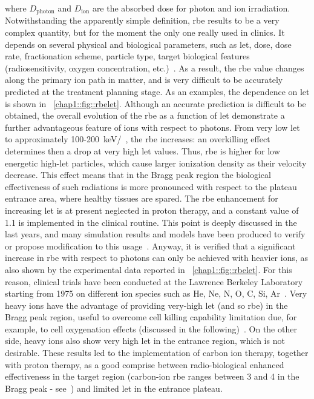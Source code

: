 where $D_{\mathrm{photon}}$ and $D_{\mathrm{ion}}$ are the absorbed dose for photon and ion irradiation. Notwithstanding the apparently simple definition, \gls{rbe} results to be a very complex quantity, but for the moment the only one really used in clinics. It depends on several physical and biological parameters, such as \gls{let}, dose, dose rate, fractionation scheme, particle type, target biological features (radiosensitivity, oxygen concentration, etc.)~\parencite{Durante2009}. As a result, the \gls{rbe} value changes along the primary ion path in matter, and is very difficult to be accurately predicted at the treatment planning stage. As an examples, the dependence on \gls{let} is shown in \figurename~\ref{chap1::fig::rbelet}.  Although an accurate prediction is difficult to be obtained, the overall evolution of the \gls{rbe} as a function of \gls{let} demonstrate a further advantageous feature of ions with respect to photons. From very low \gls{let} to approximately 100-200~keV/\charmum ~, the \gls{rbe} increases: an overkilling effect determines then a drop at very high \gls{let} values. Thus, \gls{rbe} is higher for low energetic high-\gls{let} particles, which cause larger ionization density as their velocity decrease. This effect means that in the Bragg peak region the biological effectiveness of such radiations is more pronounced with respect to the plateau entrance area, where healthy tissues are spared. The \gls{rbe} enhancement for increasing \gls{let} is at present neglected in proton therapy, and a constant value of 1.1 is implemented in the clinical routine. This point is deeply discussed in the last years, and many simulation results and models have been produced to verify or propose modification to this usage~\parencite{Giantsoudi2013, Sethi2014, Guan2015, Jones2015, McNamara2015, Giovannini2016}. Anyway,  it is verified that a significant increase in \gls{rbe} with respect to photons can only be achieved with heavier ions, as also shown by the experimental data reported in \figurename~\ref{chap1::fig::rbelet}. For this reason, clinical trials have been conducted at the Lawrence Berkeley Laboratory starting from 1975 on different ion species such as He, Ne, N, O, C, Si, Ar~\parencite{Castro1995}. Very heavy ions have the advantage of providing very-high \gls{let} (and so \gls{rbe}) in the Bragg peak region, useful to overcome cell killing capability limitation due, for example, to cell oxygenation effects (discussed in the following)~\parencite{Blakely1984}. On the other side, heavy ions also show very high \gls{let} in the entrance region, which is not desirable. These results led to the implementation of carbon ion therapy, together with proton therapy, as a good comprise between radio-biological enhanced effectiveness in the target region (carbon-ion \gls{rbe} ranges between 3 and 4 in the Bragg peak - see~\cite{Wilkens2008}) and limited \gls{let} in the entrance plateau. 

